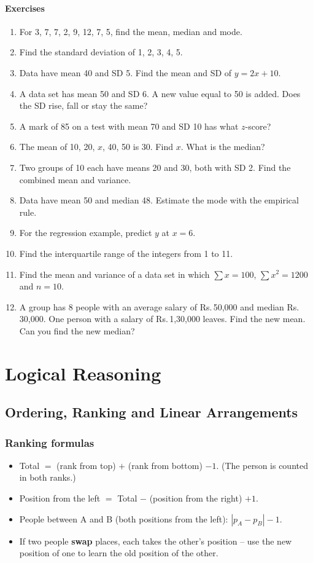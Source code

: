 \documentclass[11pt,a4paper,openany]{report}
\newenvironment{exercises}{\subsection*{Exercises \thechapter}\begin{enumerate}[label=\textbf{\thechapter.\arabic*},leftmargin=3.2em]}{\end{enumerate}}
\newcommand{\Rs}{Rs.\,}
\begin{document}
\begin{exercises}
\item For 3, 7, 7, 2, 9, 12, 7, 5, find the mean, median and mode.
\item Find the standard deviation of 1, 2, 3, 4, 5.
\item Data have mean 40 and SD 5. Find the mean and SD of $y=2x+10$.
\item A data set has mean 50 and SD 6. A new value equal to 50 is added. Does the SD rise, fall or stay the same?
\item A mark of 85 on a test with mean 70 and SD 10 has what $z$-score?
\item The mean of 10, 20, $x$, 40, 50 is 30. Find $x$. What is the median?
\item Two groups of 10 each have means 20 and 30, both with SD 2. Find the combined mean and variance.
\item Data have mean 50 and median 48. Estimate the mode with the empirical rule.
\item For the regression example, predict $y$ at $x=6$.
\item Find the interquartile range of the integers from 1 to 11.
\item Find the mean and variance of a data set in which $\sum x=100$, $\sum x^2=1200$ and $n=10$.
\item A group has 8 people with an average salary of \Rs50,000 and median \Rs30,000. One person with a salary of \Rs1,30,000 leaves. Find the new mean. Can you find the new median?
\end{exercises}

\part{Logical Reasoning}
\chapter{Ordering, Ranking and Linear Arrangements}\label{ch:rank}

\section{Ranking formulas}
\begin{itemize}
\item Total $=$ (rank from top) $+$ (rank from bottom) $-1$. (The person is counted in both ranks.)
\item Position from the left $=$ Total $-$ (position from the right) $+1$.
\item People between A and B (both positions from the left): $|p_A-p_B|-1$.
\item If two people \textbf{swap} places, each takes the other's position -- use the new position of one to learn the old position of the other.
\end{itemize}
\end{document}
